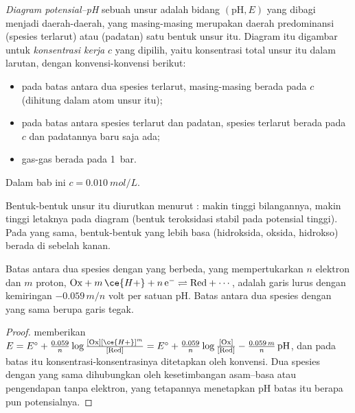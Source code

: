 \begin{definition}\label{def:b1:e-ph-diagrams:e-ph-diagram}
\emph{Diagram potensial--pH} sebuah unsur
adalah bidang $(\mathrm{pH}, E)$ yang dibagi menjadi daerah-daerah, yang
masing-masing merupakan daerah predominansi (spesies terlarut) atau
 (padatan) satu bentuk unsur itu. Diagram itu digambar
untuk \emph{konsentrasi kerja} $c$ yang dipilih,
yaitu konsentrasi total unsur itu dalam larutan, dengan konvensi-konvensi
berikut:
\begin{itemize}
  \item pada batas antara dua spesies terlarut, masing-masing berada pada
        $c$ (dihitung dalam atom unsur itu);
  \item pada batas antara spesies terlarut dan padatan, spesies terlarut
        berada pada $c$ dan padatannya baru saja ada;
  \item gas-gas berada pada \qty{1}{bar}.
\end{itemize}
Dalam bab ini $c = \qty{0.010}{mol/L}$.
\end{definition}

Bentuk-bentuk unsur itu diurutkan menurut : makin
tinggi bilangannya, makin tinggi letaknya pada diagram (bentuk
teroksidasi stabil pada potensial tinggi). Pada  yang
sama, bentuk-bentuk yang lebih basa (hidroksida, oksida, 
hidrokso) berada di sebelah kanan.

\begin{proposition}\label{prop:b1:e-ph-diagrams:boundary-slope}
Batas antara dua spesies dengan  yang berbeda, yang
 mempertukarkan $n$ elektron dan $m$ proton,
$\mathrm{Ox} + m\,\ce{H+} + n\,\mathrm{e^-} \rightleftharpoons \mathrm{Red} +
\cdots$, adalah garis lurus dengan kemiringan $-0.059\,m/n$ volt per
satuan pH. Batas antara dua spesies dengan  yang sama
berupa garis tegak.
\end{proposition}

\begin{proof}
 memberikan $E = E^\circ + \frac{0.059}{n}\log\frac{[\mathrm{Ox}]
[\ce{H+}]^m}{[\mathrm{Red}]} = E^\circ + \frac{0.059}{n}\log\frac{[\mathrm{Ox}]}
{[\mathrm{Red}]} - \frac{0.059\,m}{n}\,\mathrm{pH}$, dan pada batas itu
konsentrasi-konsentrasinya ditetapkan oleh konvensi. Dua spesies dengan
 yang sama dihubungkan oleh kesetimbangan asam--basa
atau pengendapan tanpa elektron, yang tetapannya menetapkan pH batas itu
berapa pun potensialnya.
\end{proof}

